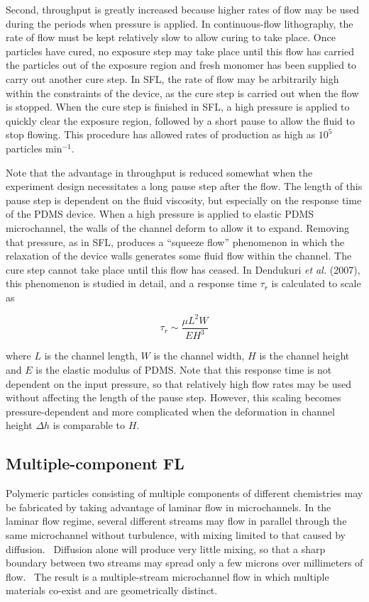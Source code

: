 Second, throughput is greatly increased because higher rates of flow may be used during the periods when pressure is
applied.  In continuous-flow lithography, the rate of flow must be kept relatively slow to allow curing to take place.
Once particles have cured, no exposure step may take place until this flow has carried the particles out of the
exposure region and fresh monomer has been supplied to carry out another cure step.  In SFL, the rate of flow
may be arbitrarily high within the constraints of the device, as the cure step is carried out when the flow is stopped. 
When the cure step is finished in SFL, a high pressure is applied to quickly clear the exposure region, followed by a 
short pause to allow the fluid to stop flowing.  This procedure has allowed rates of production as high as 
$10^5$ particles min$^{-1}$.~\cite{dendukuri-sfl}

Note that the advantage in throughput is reduced somewhat when the experiment design necessitates a long pause step
after the flow. The length of this pause step is dependent on the fluid viscosity, but especially on the 
response time of the PDMS device.  When a high pressure is applied to elastic PDMS microchannel, the 
walls of the channel deform to allow it to expand.  Removing that pressure, as in SFL, produces a ``squeeze flow''
phenomenon in which the relaxation of the device walls generates some fluid flow within the channel. The cure step 
cannot take place until this flow has ceased.  In Dendukuri \textit{et al.} (2007), this phenomenon is studied in detail,
and a response time $\tau_r$ is calculated to scale as

\begin{equation}
\tau_r \sim \frac{\mu L^2 W}{EH^3}
\end{equation}

where $L$ is the channel length, $W$ is the channel width, $H$ is the channel height and $E$ is the elastic
modulus of PDMS.  Note that this response time is not dependent on the input pressure, so that relatively high
flow rates may be used without affecting the length of the pause step. However, this scaling becomes pressure-dependent
and more complicated when the deformation in channel height $\Delta h$ is comparable to $H$.~\cite{dendukuri-sfl}

\subsection{Multiple-component FL}

Polymeric particles consisting of multiple components of different chemistries may be fabricated by taking advantage
of laminar flow in microchannels.  In the laminar flow regime, several different streams may flow in parallel through
the same microchannel without turbulence, with mixing limited to that caused by diffusion.~\cite{?}  Diffusion alone
will produce very little mixing, so that a sharp boundary between two streams may spread only a few microns over
millimeters of flow.~\cite{?}  The result is a multiple-stream microchannel flow in which multiple materials
co-exist and are geometrically distinct.

